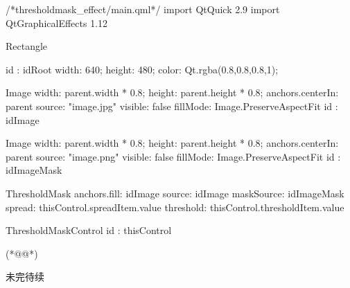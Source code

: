 \label{f000076}    %
\FloatBarrier                                  %
\begin{thebookfilesourceone}[escapeinside={(*@}{@*)},
caption=GoodLuck,
title=\filesourcenumbernameone \thefilesourcenumber
]
/*thresholdmask_effect/main.qml*/
import QtQuick 2.9
import QtGraphicalEffects 1.12

Rectangle {
    id : idRoot
    width: 640;
    height: 480;
    color: Qt.rgba(0.8,0.8,0.8,1);

    Image{
        width: parent.width * 0.8;
        height: parent.height * 0.8;
        anchors.centerIn: parent
        source: "image.jpg"
        visible: false
        fillMode: Image.PreserveAspectFit
        id : idImage
    }

    Image{
        width: parent.width * 0.8;
        height: parent.height * 0.8;
        anchors.centerIn: parent
        source: "image.png"
        visible: false
        fillMode: Image.PreserveAspectFit
        id : idImageMask
    }

     ThresholdMask{
         anchors.fill: idImage
         source: idImage
         maskSource: idImageMask
         spread: thisControl.spreadItem.value
         threshold: thisControl.thresholdItem.value
     }

     ThresholdMaskControl{
         id : thisControl
     }

}(*@\marginpar[\hfill\setlength\fboxsep{2pt}\fbox{\footnotesize{\kaishu\parbox{1em}{\setlength{\baselineskip}{2pt}\filesourcenumbernameone}}\footnotesize{\thefilesourcenumber}}]{\setlength\fboxsep{2pt}\fbox{\footnotesize{\kaishu\parbox{1em}{\setlength{\baselineskip}{2pt}\filesourcenumbernameone}}\footnotesize{\thefilesourcenumber}}}@*)\end{thebookfilesourceone}          %
\addtocounter{lstlisting}{-1}   %


未完待续









